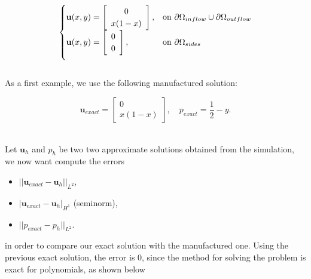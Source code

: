 \documentclass[a4paper,11pt,oneside]{book}
\begin{document}
\[
\begin{cases}
\mathbf{u}(x,y) = \left[ \begin{array}{c} 0 \\ x(1-x) \end{array} \right] , & \mbox{on } \partial \Omega_{inflow} \cup \partial \Omega_{outflow} \\

\vspace{.2cm}

\mathbf{u}(x,y) = \left[ \begin{array}{c} 0 \\ 0 \end{array} \right], & \mbox{on } \partial \Omega_{sides}
\end{cases}
\]
\\
As a first example, we use the following manufactured solution:

\[
\mathbf{u}_{exact} = \left[ \begin{array}{c} 0 \\ x(1-x) \end{array} \right], \quad
p_{exact} = \frac{1}{2}-y.
\]
\\
\begin{center}
\end{center}
Let $\mathbf{u}_h$ and $p_h$ be two two approximate solutions obtained from the simulation, we now want compute the errors

\begin{itemize}
\item $|| \mathbf{u}_{exact} - \mathbf{u}_h ||_{L^2}$,
\item $ | \mathbf{u}_{exact} - \mathbf{u}_h |_{H^1}$ (seminorm),
\item $|| p_{exact} - p_h ||_{L^2} $.
\end{itemize}
in order to compare our exact solution with the manufactured one.
Using the previous exact solution, the error is 0, since the method for solving the problem is exact for polynomials, as shown below
\end{document}
